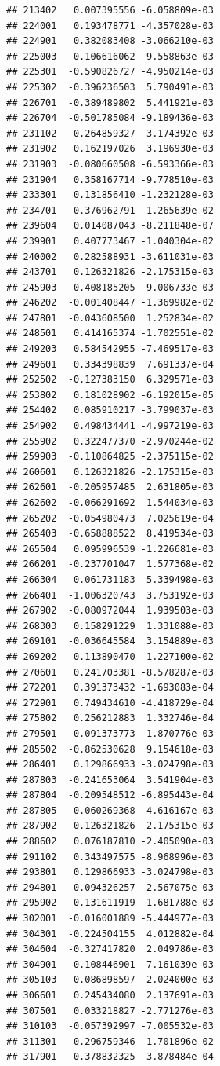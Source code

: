 \documentclass[ignorenonframetext,]{beamer}
\begin{document}
\begin{frame}[fragile]
\begin{verbatim}
## 213402   0.007395556 -6.058809e-03
## 224001   0.193478771 -4.357028e-03
## 224901   0.382083408 -3.066210e-03
## 225003  -0.106616062  9.558863e-03
## 225301  -0.590826727 -4.950214e-03
## 225302  -0.396236503  5.790491e-03
## 226701  -0.389489802  5.441921e-03
## 226704  -0.501785084 -9.189436e-03
## 231102   0.264859327 -3.174392e-03
## 231902   0.162197026  3.196930e-03
## 231903  -0.080660508 -6.593366e-03
## 231904   0.358167714 -9.778510e-03
## 233301   0.131856410 -1.232128e-03
## 234701  -0.376962791  1.265639e-02
## 239604   0.014087043 -8.211848e-07
## 239901   0.407773467 -1.040304e-02
## 240002   0.282588931 -3.611031e-03
## 243701   0.126321826 -2.175315e-03
## 245903   0.408185205  9.006733e-03
## 246202  -0.001408447 -1.369982e-02
## 247801  -0.043608500  1.252834e-02
## 248501   0.414165374 -1.702551e-02
## 249203   0.584542955 -7.469517e-03
## 249601   0.334398839  7.691337e-04
## 252502  -0.127383150  6.329571e-03
## 253802   0.181028902 -6.192015e-05
## 254402   0.085910217 -3.799037e-03
## 254902   0.498434441 -4.997219e-03
## 255902   0.322477370 -2.970244e-02
## 259903  -0.110864825 -2.375115e-02
## 260601   0.126321826 -2.175315e-03
## 262601  -0.205957485  2.631805e-03
## 262602  -0.066291692  1.544034e-03
## 265202  -0.054980473  7.025619e-04
## 265403  -0.658888522  8.419534e-03
## 265504   0.095996539 -1.226681e-03
## 266201  -0.237701047  1.577368e-02
## 266304   0.061731183  5.339498e-03
## 266401  -1.006320743  3.753192e-03
## 267902  -0.080972044  1.939503e-03
## 268303   0.158291229  1.331088e-03
## 269101  -0.036645584  3.154889e-03
## 269202   0.113890470  1.227100e-02
## 270601   0.241703381 -8.578287e-03
## 272201   0.391373432 -1.693083e-04
## 272901   0.749434610 -4.418729e-04
## 275802   0.256212883  1.332746e-04
## 279501  -0.091373773 -1.870776e-03
## 285502  -0.862530628  9.154618e-03
## 286401   0.129866933 -3.024798e-03
## 287803  -0.241653064  3.541904e-03
## 287804  -0.209548512 -6.895443e-04
## 287805  -0.060269368 -4.616167e-03
## 287902   0.126321826 -2.175315e-03
## 288602   0.076187810 -2.405090e-03
## 291102   0.343497575 -8.968996e-03
## 293801   0.129866933 -3.024798e-03
## 294801  -0.094326257 -2.567075e-03
## 295902   0.131611919 -1.681788e-03
## 302001  -0.016001889 -5.444977e-03
## 304301  -0.224504155  4.012882e-04
## 304604  -0.327417820  2.049786e-03
## 304901  -0.108446901 -7.161039e-03
## 305103   0.086898597 -2.024000e-03
## 306601   0.245434080  2.137691e-03
## 307501   0.033218827 -2.771276e-03
## 310103  -0.057392997 -7.005532e-03
## 311301   0.296759346 -1.701896e-02
## 317901   0.378832325  3.878484e-04

\end{verbatim}
\end{frame}
\end{document}
